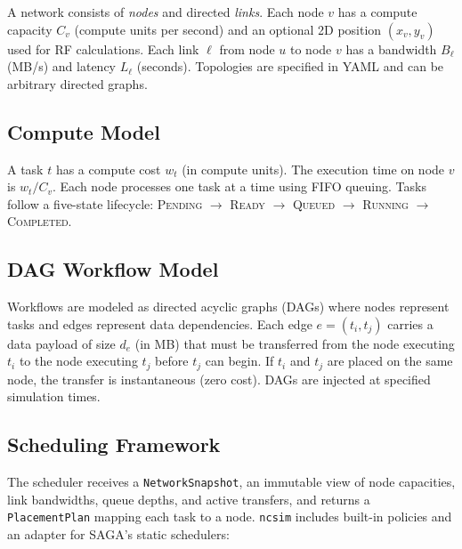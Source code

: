 \documentclass[conference]{IEEEtran}
\newcommand{\ncsim}{\texttt{ncsim}}
\begin{document}
A network consists of \emph{nodes} and directed \emph{links}.  Each node $v$
has a compute capacity $C_v$ (compute units per second) and an optional 2D
position $(x_v, y_v)$ used for RF calculations.  Each link $\ell$ from node
$u$ to node $v$ has a bandwidth $B_\ell$ (MB/s) and latency $L_\ell$
(seconds).  Topologies are specified in YAML and can be arbitrary directed
graphs.

\subsection{Compute Model}

A task $t$ has a compute cost $w_t$ (in compute units).  The execution time
on node $v$ is $w_t / C_v$.  Each node processes one task at a time using
FIFO queuing.  Tasks follow a five-state lifecycle: \textsc{Pending}
$\rightarrow$ \textsc{Ready} $\rightarrow$ \textsc{Queued} $\rightarrow$
\textsc{Running} $\rightarrow$ \textsc{Completed}.

\subsection{DAG Workflow Model}

Workflows are modeled as directed acyclic graphs (DAGs) where nodes represent
tasks and edges represent data dependencies.  Each edge $e = (t_i, t_j)$
carries a data payload of size $d_e$ (in MB) that must be transferred from
the node executing $t_i$ to the node executing $t_j$ before $t_j$ can begin.
If $t_i$ and $t_j$ are placed on the same node, the transfer is
instantaneous (zero cost).  DAGs are injected at specified simulation times.

\subsection{Scheduling Framework}

The scheduler receives a \texttt{NetworkSnapshot}, an immutable view of
node capacities, link bandwidths, queue depths, and active transfers, and
returns a \texttt{PlacementPlan} mapping each task to a node.  \ncsim{}
includes built-in policies and an adapter for SAGA's static schedulers:
\end{document}
